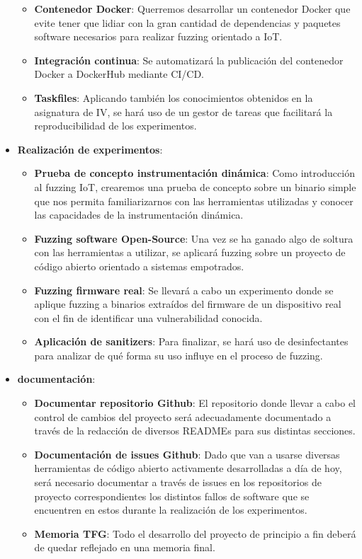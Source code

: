 \begin{itemize}
    \begin{itemize}
        \item \textbf{Contenedor Docker}: Querremos desarrollar un contenedor Docker que evite tener que lidiar con la gran cantidad de dependencias 
        y paquetes software necesarios para realizar fuzzing orientado a IoT.
        \item \textbf{Integración continua}: Se automatizará la publicación del contenedor Docker a DockerHub mediante CI/CD.
        \item \textbf{Taskfiles}: Aplicando también los conocimientos obtenidos en la asignatura de IV, se hará uso de un gestor de tareas que 
        facilitará la reproducibilidad de los experimentos. 
    \end{itemize}
    \item \textbf{Realización de experimentos}:
    \begin{itemize}
        \item \textbf{Prueba de concepto instrumentación dinámica}: Como introducción al fuzzing IoT, crearemos una prueba de concepto sobre
        un binario simple que nos permita familiarizarnos con las herramientas utilizadas y conocer las capacidades de la instrumentación dinámica.
        \item \textbf{Fuzzing software Open-Source}: Una vez se ha ganado algo de soltura con las herramientas a utilizar, se aplicará fuzzing 
        sobre un proyecto de código abierto orientado a sistemas empotrados.
        \item \textbf{Fuzzing firmware real}: Se llevará a cabo un experimento donde se aplique fuzzing a binarios extraídos del firmware de un 
        dispositivo real con el fin de identificar una vulnerabilidad conocida. 
        \item \textbf{Aplicación de sanitizers}: Para finalizar, se hará uso de desinfectantes para analizar de qué forma 
        su uso influye en el proceso de fuzzing.
    \end{itemize}
    \item \textbf{documentación}:
    \begin{itemize}
        \item \textbf{Documentar repositorio Github}: El repositorio donde llevar a cabo el control de cambios del proyecto será 
        adecuadamente documentado a través de la redacción de diversos READMEs para sus distintas secciones.
        \item \textbf{Documentación de issues Github}: Dado que van a usarse diversas herramientas de código abierto activamente 
        desarrolladas a día de hoy, será necesario documentar a través de issues en los repositorios de proyecto correspondientes
        los distintos fallos de software que se encuentren en estos durante la realización de los experimentos.
        \item \textbf{Memoria TFG}: Todo el desarrollo del proyecto de principio a fin deberá de quedar reflejado en una memoria final.
    \end{itemize}
\end{itemize}

